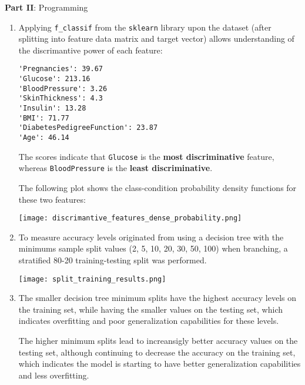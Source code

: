 \documentclass[12pt]{article}
\begin{document}
\large{\textbf{Part II}: Programming}\normalsize

\begin{enumerate}[leftmargin=\labelsep, label=\textbf{\arabic*.)}]
    \item Applying \texttt{f\_classif} from the \texttt{sklearn} library upon the dataset (after splitting into feature data matrix and target vector) allows understanding of the discrimantive power of each feature:

          \begin{lstlisting}[basicstyle=\ttfamily\centering]
'Pregnancies': 39.67
'Glucose': 213.16
'BloodPressure': 3.26
'SkinThickness': 4.3
'Insulin': 13.28
'BMI': 71.77
'DiabetesPedigreeFunction': 23.87
'Age': 46.14
        \end{lstlisting}
          The scores indicate that \texttt{Glucose} is the \textbf{most discriminative} feature, whereas \texttt{BloodPressure} is the \textbf{least discriminative}.

          The following plot shows the class-condition probability density functions for these two features:

          \begin{center}
              \texttt{[image: discrimantive\_features\_dense\_probability.png]}
          \end{center}

    \item To measure accuracy levels originated from using a decision tree with the minimums sample split values (2, 5, 10, 20, 30, 50, 100) when branching, a stratified 80-20 training-testing split was performed.

          \begin{center}
              \texttt{[image: split\_training\_results.png]}
          \end{center}

    \item The smaller decision tree minimum splits have the highest accuracy levels on the training set, while having the smaller values on the testing set, which indicates overfitting and poor generalization capabilities for these levels.

          The higher minimum splits lead to increansigly better accuracy values on the testing set, although continuing to decrease the accuracy on the training set, which indicates the model is starting to have better generalization capabilities and less overfitting.


\end{enumerate}
\end{document}
